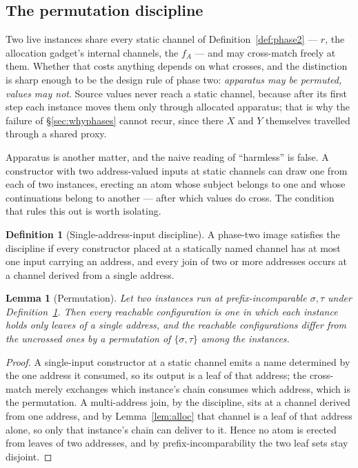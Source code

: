 \documentclass[11pt]{article}
\theoremstyle{plain}
\newtheorem{lemma}[theorem]{Lemma}
\theoremstyle{definition}
\newtheorem{definition}[theorem]{Definition}
\theoremstyle{remark}
\begin{document}
\subsection{The permutation discipline}
\label{sec:perm}

Two live instances share every static channel of
Definition~\ref{def:phase2} --- $r$, the allocation gadget's internal
channels, the $f_{A}$ --- and may cross-match freely at them. Whether that
costs anything depends on what crosses, and the distinction is sharp enough
to be the design rule of phase two: \emph{apparatus may be permuted, values
may not}. Source values never reach a static channel, because after its first
step each instance moves them only through allocated apparatus; that is why
the failure of \S\ref{sec:whyphases} cannot recur, since there $X$ and $Y$
themselves travelled through a shared proxy.

Apparatus is another matter, and the naive reading of ``harmless'' is false.
A constructor with two address-valued inputs at static channels can draw one
from each of two instances, erecting an atom whose subject belongs to one and
whose continuations belong to another --- after which values do cross. The
condition that rules this out is worth isolating.

\begin{definition}[Single-address-input discipline]
\label{def:sai}
A phase-two image satisfies the discipline if every constructor placed at a
statically named channel has at most one input carrying an address, and every
join of two or more addresses occurs at a channel derived from a single
address.
\end{definition}

\begin{lemma}[Permutation]
\label{lem:perm}
Let two instances run at prefix-incomparable $\sigma,\tau$ under
Definition~\ref{def:sai}. Then every reachable configuration is one in which
each instance holds only leaves of a single address, and the reachable
configurations differ from the uncrossed ones by a permutation of
$\{\sigma,\tau\}$ among the instances.
\end{lemma}

\begin{proof}
A single-input constructor at a static channel emits a name determined by the
one address it consumed, so its output is a leaf of that address; the
cross-match merely exchanges which instance's chain consumes which address,
which is the permutation. A multi-address join, by the discipline, sits at a
channel derived from one address, and by Lemma~\ref{lem:alloc} that channel
is a leaf of that address alone, so only that instance's chain can deliver to
it. Hence no atom is erected from leaves of two addresses, and by
prefix-incomparability the two leaf sets stay disjoint.
\end{proof}
\end{document}

